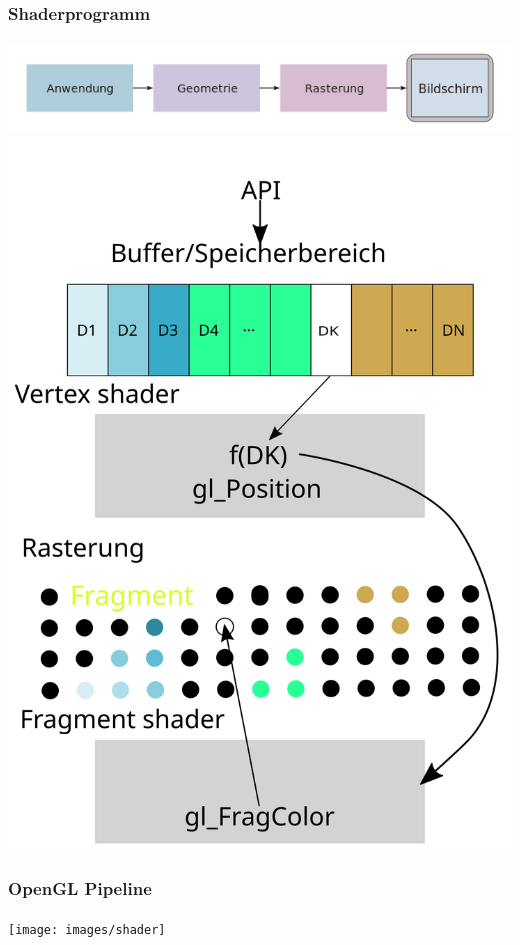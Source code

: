 \documentclass{beamer}
\begin{document}
  
\begin{frame}
    \frametitle{ Shaderprogramm}
\framesubtitle{}
\begin{center}
\includegraphics[scale=0.26]{images/cgpipeline_grob}
\\
\includegraphics[scale=0.20]{images/Zeichnung_Shaderpipeline}

\end{center}
\end{frame}

\begin{frame}
    \frametitle{OpenGL Pipeline}
\framesubtitle{}
    \begin{block}{}
\begin{center}
\texttt{[image: images/shader]}
\end{center}
\end{block}
\end{frame}
\end{document}
